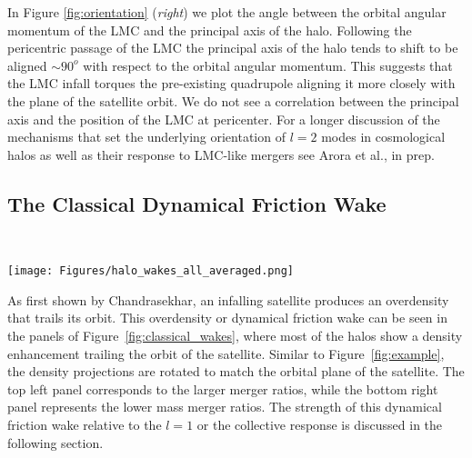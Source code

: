 \documentclass[twocolumn, linenumbers]{openjournal}
\begin{document}
In Figure \ref{fig:orientation} (\emph{right}) we plot the angle between the orbital angular momentum of the LMC and the 
principal axis of the halo. Following the pericentric passage of the LMC the principal axis of the halo tends to shift to be 
aligned $\sim 90^o$ with respect to the orbital angular momentum. This suggests that the LMC infall torques the pre-existing quadrupole aligning it more closely with the plane of the satellite orbit. We do not see a correlation between the principal axis and the position of the LMC at pericenter. For a longer discussion of the mechanisms that set the underlying orientation of $l=2$ modes in cosmological halos as well as their response to LMC-like mergers see Arora et al., in prep. 




\subsection{The Classical Dynamical Friction Wake}~\label{sec:classical_wake}

\begin{figure*}[h]
    \texttt{[image: Figures/halo\_wakes\_all\_averaged.png]}
    \caption[Dynamical Friction Wake]{Dynamical friction wakes for all 18 halos in the MW-est suite.
     The axes are rotated to show the plane of the LMC orbit, and the density is averaged over 
     $-25$~kpc $< z < 25$~kpc relative to the $l=0$ mode. The panels are sorted by decreasing merger 
     ratio (top--bottom and right--left). The black line indicates that orbit of the LMC 
     (dashed \emph{before} pericenter and dotted \emph{after} pericenter), and the black dot 
     shows the current position of the LMC (\emph{at} pericenter).} 
    \label{fig:classical_wakes}
\end{figure*}
     
    

As first shown by Chandrasekhar, an infalling satellite produces an overdensity that trails 
its orbit. This overdensity or dynamical friction wake can be seen in the panels of 
Figure~\ref{fig:classical_wakes}, where most of the halos show a density enhancement trailing 
the orbit of the satellite.  Similar to Figure~\ref{fig:example},  the density projections are 
rotated to match the orbital plane of the satellite. The top left panel corresponds to the larger 
merger ratios, while the bottom right panel represents the lower mass merger ratios. The strength 
of this dynamical friction wake relative to the $l=1$ or the collective response is discussed in the 
following section.
\end{document}

